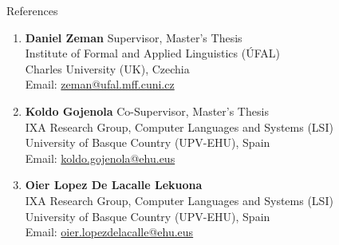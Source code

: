 \documentclass{resume} %
\begin{document}
\begin{rSection}{References}

    \begin{enumerate}
        \item \textbf{Daniel Zeman} \hfill Supervisor, Master's Thesis\\
            Institute of Formal and Applied Linguistics ({\'U}FAL)\\
            Charles University (UK), Czechia\\
            Email: \href{mailto:zeman@ufal.mff.cuni.cz}{zeman@ufal.mff.cuni.cz}
        
        \item \textbf{Koldo Gojenola} \hfill Co-Supervisor, Master's Thesis\\
            IXA Research Group, Computer Languages and Systems (LSI)\\
            University of Basque Country (UPV-EHU), Spain\\
            Email: \href{mailto:koldo.gojenola@ehu.eus}{koldo.gojenola@ehu.eus}
        
        \item \textbf{Oier Lopez De Lacalle Lekuona}\\
            IXA Research Group, Computer Languages and Systems (LSI)\\
            University of Basque Country (UPV-EHU), Spain\\
            Email: \href{mailto:oier.lopezdelacalle@ehu.eus}{oier.lopezdelacalle@ehu.eus}
    \end{enumerate}

\end{rSection}
\end{document}
